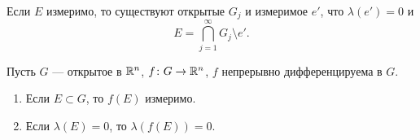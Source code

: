 \begin{cor}
	Если $ E$ измеримо, то существуют открытые $ G_j$ и измеримое  $ e'$, что $ \lambda (e') = 0$ и 
	\[
	E = \bigcap_{j=1}^{\infty} G_j \setminus e'
	.\] 
\end{cor}
\begin{thm}
	Пусть $ G$ --- открытое в $ \mathbb{R}^{n}$, $ f \colon G \to \mathbb{R}^{n} $, $ f$  непрерывно дифференцируема в  $ G$.
	 \begin{enumerate}[noitemsep]
		 \item Если $ E \subset G$, то $ f(E)$ измеримо.
		 \item Если $ \lambda (E) = 0$, то $ \lambda (f(E)) = 0$.
	\end{enumerate} 
\end{thm}
